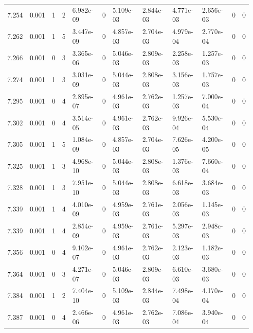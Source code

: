 \documentclass[preview]{standalone}
\begin{document}
{{{{{{{{{\begin{tabular}{L{1.2cm}C{1.2cm} C{0.3cm}C{0.5cm} C{1.4cm}C{1.4cm} C{1.4cm}C{1.4cm} C{1.6cm}C{1.6cm} C{1.6cm}C{1.6cm}}
  7.254  &  0.001  & 1     &  2 &  6.982e-09  & 0  &  5.109e-03&   2.844e-03& 4.771e-03 & 2.656e-03   &  0 & 0  \\ 
  7.262  &  0.001  & 1     &  5 &  3.447e-09  & 0  &  4.857e-03&   2.704e-03& 4.979e-04 & 2.770e-04   &  0 & 0  \\ 
  7.266  &  0.001  & 0     &  3 &  3.365e-06  & 0  &  5.046e-03&   2.809e-03& 2.258e-03 & 1.257e-03   &  0 & 0  \\ 
  7.274  &  0.001  & 1     &  3 &  3.031e-09  & 0  &  5.044e-03&   2.808e-03& 3.156e-03 & 1.757e-03   &  0 & 0  \\ 
  7.295  &  0.001  & 0     &  4 &  2.895e-07  & 0  &  4.961e-03&   2.762e-03& 1.257e-03 & 7.000e-04   &  0 & 0  \\ 
  7.302  &  0.001  & 0     &  4 &  3.514e-05  & 0  &  4.961e-03&   2.762e-03& 9.926e-04 & 5.530e-04   &  0 & 0  \\ 
  7.305  &  0.001  & 1     &  5 &  1.084e-09  & 0  &  4.857e-03&   2.704e-03& 7.626e-05 & 4.200e-05   &  0 & 0  \\ 
  7.325  &  0.001  & 1     &  3 &  4.968e-10  & 0  &  5.044e-03&   2.808e-03& 1.376e-03 & 7.660e-04   &  0 & 0  \\ 
  7.328  &  0.001  & 1     &  3 &  7.951e-10  & 0  &  5.044e-03&   2.808e-03& 6.618e-03 & 3.684e-03   &  0 & 0  \\ 
  7.339  &  0.001  & 1     &  4 &  4.010e-09  & 0  &  4.959e-03&   2.761e-03& 2.056e-03 & 1.145e-03   &  0 & 0  \\ 
  7.339  &  0.001  & 1     &  4 &  2.854e-09  & 0  &  4.959e-03&   2.761e-03& 5.297e-03 & 2.948e-03   &  0 & 0  \\ 
  7.356  &  0.001  & 0     &  4 &  9.102e-07  & 0  &  4.961e-03&   2.762e-03& 2.123e-03 & 1.182e-03   &  0 & 0  \\ 
  7.364  &  0.001  & 0     &  3 &  4.271e-07  & 0  &  5.046e-03&   2.809e-03& 6.610e-03 & 3.680e-03   &  0 & 0  \\ 
  7.384  &  0.001  & 1     &  2 &  7.404e-10  & 0  &  5.109e-03&   2.844e-03& 7.498e-04 & 4.170e-04   &  0 & 0  \\ 
  7.387  &  0.001  & 0     &  4 &  2.466e-06  & 0  &  4.961e-03&   2.762e-03& 7.086e-04 & 3.940e-04   &  0 & 0  \\ 
\hline 
\end{tabular} 

}}}}}}}}}
\end{document}
